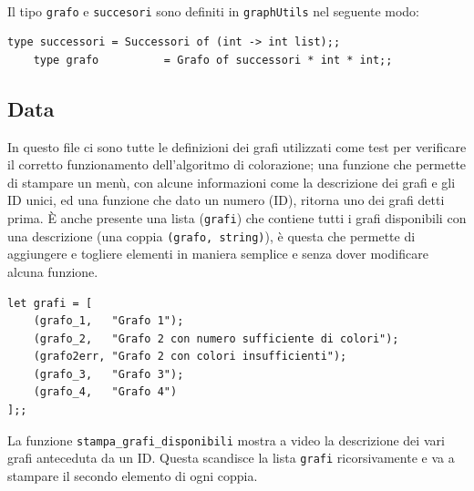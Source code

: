 \ \\
Il tipo \lstinline[style=cmd]|grafo| e \lstinline[style=cmd]|succesori|  sono definiti in \lstinline[style=cmd]|graphUtils| nel seguente modo:

\begin{lstlisting}[style=caml]
	type successori = Successori of (int -> int list);;
	type grafo 			= Grafo of successori * int * int;;
\end{lstlisting}
\newpage
\subsection{Data}
In questo file ci sono tutte le definizioni dei grafi utilizzati come test per verificare il corretto funzionamento dell'algoritmo di colorazione; una funzione che permette di stampare un menù, con alcune informazioni come la descrizione dei grafi e gli ID unici, ed una funzione che dato un numero (ID), ritorna uno dei grafi detti prima.
\`{E} anche presente una lista (\lstinline[style=cmd]|grafi|) che contiene tutti i grafi disponibili con una descrizione (una coppia \lstinline[style=cmd]|(grafo, string)|), è questa che permette di aggiungere e togliere elementi in maniera semplice e senza dover modificare alcuna funzione.\\

\begin{lstlisting}[style=caml, caption={Lista di coppie (grafo,string) utilizzata per assiocare ad un grafo una descrizione.}]
let grafi = [
	(grafo_1,   "Grafo 1"); 
	(grafo_2,   "Grafo 2 con numero sufficiente di colori"); 
	(grafo2err, "Grafo 2 con colori insufficienti"); 
	(grafo_3,   "Grafo 3"); 
	(grafo_4,   "Grafo 4")
];;
\end{lstlisting}

La funzione \lstinline[style=cmd]|stampa_grafi_disponibili| mostra a video la descrizione dei vari grafi anteceduta da un ID. Questa scandisce la lista \lstinline[style=cmd]|grafi| ricorsivamente e va a stampare il secondo elemento di ogni coppia.

